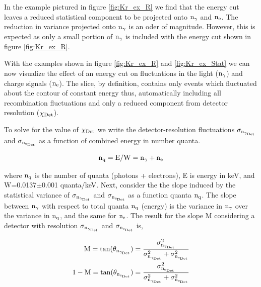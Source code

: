 \newpage

\noindent In the example pictured in figure \ref {fig:Kr_ex_R} we find that the energy cut leaves a reduced statistical component to be projected onto $\rm n_\gamma$ and $\rm n_e$. The reduction in variance projected onto $\rm n_\gamma$ is an oder of magnitude. However, this is expected as only a small portion of $\rm n_\gamma$ is included with the energy cut shown in figure \ref {fig:Kr_ex_R}. 

With the examples shown in figure \ref{fig:Kr_ex_R} and \ref{fig:Kr_ex_Stat} we can now visualize the effect of an energy cut on fluctuations in the light ($\rm n_\gamma$) and charge signals ($\rm n_e$). The slice, by definition, contains only events which fluctuated about the contour of constant energy thus, automatically including all recombination fluctuations and only a reduced component from detector resolution ($\rm \chi_{Det}$).

To solve for the value of  $\rm \chi_{Det}$ we write the detector-resolution fluctuations $\rm \sigma_{n_{\gamma_{Det}}}$ and $\rm \sigma_{n_{e_{Det}}}$ as a function of combined energy in number quanta.

\begin{equation}
\rm n_q= E/W = n_\gamma + n_e
\label{eq:n_Q}
\end{equation}

\noindent where $\rm n_q$ is the number of quanta (photons + electrons), E is energy in keV, and W=0.0137$\pm$0.001 quanta/keV. Next, consider the the slope induced by the statistical variance of $\rm \sigma_{n_{\gamma_{Det}}}$ and $\rm \sigma_{n_{e_{Det}}}$ as a function quanta $\rm n_q$. The slope between $\rm n_\gamma$ with respect to total quanta $\rm n_q$ (energy) is the variance in $\rm n_\gamma$ over the variance in $\rm n_q$, and the same for $\rm n_e$. The result for the slope M considering a detector with resolution $\rm \sigma_{n_{\gamma_{Det}}}$ and $\rm \sigma_{n_{e_{Det}}}$ is,

\begin{equation}
\begin{split}
\rm M = tan(\theta_{n_{\gamma_{Det}}})=\frac{\sigma_{n_{\gamma_{Det}}}^2}{\sigma_{n_{\gamma_{Det}}}^2+ \sigma_{n_{e_{Det}}}^2} \\
\rm 1-M = tan(\theta_{n_{e_{Det}}})=\frac{\sigma_{n_{e_{Det}}}^2}{\sigma_{n_{\gamma_{Det}}}^2+ \sigma_{n_{e_{Det}}}^2} 
\label{eq:Angle}
\end{split}
\end{equation}

